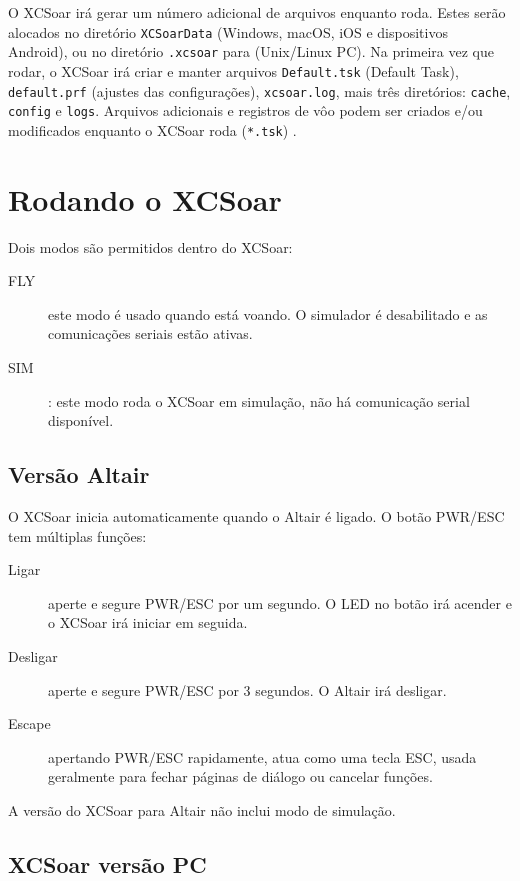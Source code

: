 O XCSoar irá gerar um número adicional de arquivos enquanto roda.  Estes serão alocados no diretório  \texttt{XCSoarData} (Windows, macOS, iOS e
dispositivos Android), ou no diretório \texttt{.xcsoar} para (Unix/Linux
PC).  Na primeira vez que rodar, o XCSoar irá criar e manter arquivos
\texttt{Default.tsk} (Default Task),  
\texttt{default.prf} 
(ajustes das configurações),
\texttt{xcsoar.log}, 
mais três diretórios: \texttt{cache},
\texttt{config} e \texttt{logs}.  Arquivos adicionais e registros de vôo podem ser criados e/ou modificados enquanto o XCSoar roda (\texttt{*.tsk}) .


\section{Rodando o XCSoar}

Dois modos são permitidos dentro do XCSoar: 
\begin{description}
\item[FLY]este modo é usado quando está voando.  O simulador é desabilitado e as comunicações seriais estão ativas.
\item[SIM] :  este modo roda o XCSoar em simulação, não há comunicação serial disponível.
\end{description}

\subsection*{Versão Altair}
O XCSoar inicia automaticamente quando o Altair é ligado.  O botão PWR/ESC tem múltiplas funções:
\begin{description}
\item[Ligar]  aperte e segure PWR/ESC por um segundo.  O LED no botão irá acender e o XCSoar irá iniciar em seguida.
\item[Desligar] aperte e segure PWR/ESC por 3 segundos.  O Altair irá desligar.
\item[Escape] apertando PWR/ESC rapidamente, atua como uma tecla ESC, usada geralmente para fechar páginas de diálogo ou cancelar funções.

\end{description}

A versão do XCSoar para Altair não inclui modo de simulação.

\subsection*{XCSoar versão PC}

